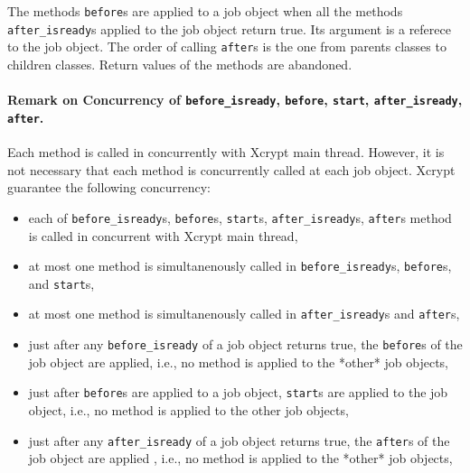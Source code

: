\documentclass[a4paper,10pt]{report}
\begin{document}
The methods \texttt{before}s are applied to a job object when all the
methods \texttt{after\_isready}s applied to the job object return
true.  Its argument is a referece to the job object.  The order of
calling \texttt{after}s is the one from parents classes to children
classes.  Return values of the methods are abandoned.

\paragraph{Remark on Concurrency of \texttt{before\_isready},
    \texttt{before}, \texttt{start}, \texttt{after\_isready}, \texttt{after}.}
Each method is called in concurrently with Xcrypt main thread.
However, it is not necessary that each method is concurrently called
at each job object.  Xcrypt guarantee the following concurrency:
\begin{itemize}
  \item each of
	\texttt{before\_isready}s, \texttt{before}s, \texttt{start}s,
	\texttt{after\_isready}s, \texttt{after}s
       method is called in concurrent with Xcrypt main thread,
  \item
    at most one method is simultanenously called in
	\texttt{before\_isready}s, \texttt{before}s, and
	\texttt{start}s,
  \item
    at most one method is simultanenously called in
	\texttt{after\_isready}s and \texttt{after}s,
  \item
       just after any \texttt{before\_isready} of a job object returns
	true, the \texttt{before}s of the job object are applied,
	i.e., no method is applied to the *other* job objects,
  \item
       just after \texttt{before}s are applied to a job object,
	\texttt{start}s are applied to the job object, i.e., no method
	is applied to the other job objects,
  \item
       just after any \texttt{after\_isready} of a job object returns
	true, the \texttt{after}s of the job object are applied ,
	i.e., no method is applied to the *other* job objects,
\end{itemize}
\end{document}
